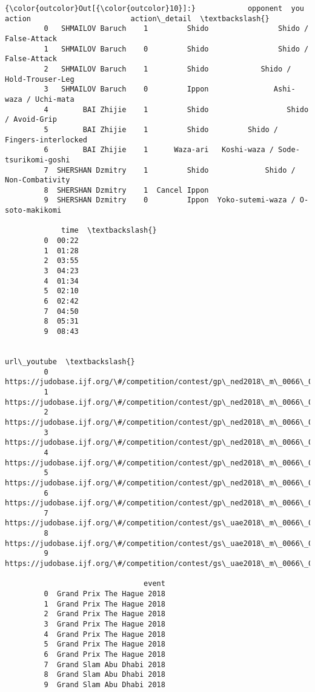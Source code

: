 \documentclass[11pt]{article}
\begin{document}
\begin{Verbatim}[commandchars=\\\{\}]
{\color{outcolor}Out[{\color{outcolor}10}]:}            opponent  you        action                       action\_detail  \textbackslash{}
         0   SHMAILOV Baruch    1         Shido                Shido / False-Attack   
         1   SHMAILOV Baruch    0         Shido                Shido / False-Attack   
         2   SHMAILOV Baruch    1         Shido            Shido / Hold-Trouser-Leg   
         3   SHMAILOV Baruch    0         Ippon               Ashi-waza / Uchi-mata   
         4        BAI Zhijie    1         Shido                  Shido / Avoid-Grip   
         5        BAI Zhijie    1         Shido         Shido / Fingers-interlocked   
         6        BAI Zhijie    1      Waza-ari   Koshi-waza / Sode-tsurikomi-goshi   
         7  SHERSHAN Dzmitry    1         Shido             Shido / Non-Combativity   
         8  SHERSHAN Dzmitry    1  Cancel Ippon                                       
         9  SHERSHAN Dzmitry    0         Ippon  Yoko-sutemi-waza / O-soto-makikomi   
         
             time  \textbackslash{}
         0  00:22   
         1  01:28   
         2  03:55   
         3  04:23   
         4  01:34   
         5  02:10   
         6  02:42   
         7  04:50   
         8  05:31   
         9  08:43   
         
                                                                      url\_youtube  \textbackslash{}
         0  https://judobase.ijf.org/\#/competition/contest/gp\_ned2018\_m\_0066\_0055   
         1  https://judobase.ijf.org/\#/competition/contest/gp\_ned2018\_m\_0066\_0055   
         2  https://judobase.ijf.org/\#/competition/contest/gp\_ned2018\_m\_0066\_0055   
         3  https://judobase.ijf.org/\#/competition/contest/gp\_ned2018\_m\_0066\_0055   
         4  https://judobase.ijf.org/\#/competition/contest/gp\_ned2018\_m\_0066\_0046   
         5  https://judobase.ijf.org/\#/competition/contest/gp\_ned2018\_m\_0066\_0046   
         6  https://judobase.ijf.org/\#/competition/contest/gp\_ned2018\_m\_0066\_0046   
         7  https://judobase.ijf.org/\#/competition/contest/gs\_uae2018\_m\_0066\_0033   
         8  https://judobase.ijf.org/\#/competition/contest/gs\_uae2018\_m\_0066\_0033   
         9  https://judobase.ijf.org/\#/competition/contest/gs\_uae2018\_m\_0066\_0033   
         
                                event  
         0  Grand Prix The Hague 2018  
         1  Grand Prix The Hague 2018  
         2  Grand Prix The Hague 2018  
         3  Grand Prix The Hague 2018  
         4  Grand Prix The Hague 2018  
         5  Grand Prix The Hague 2018  
         6  Grand Prix The Hague 2018  
         7  Grand Slam Abu Dhabi 2018  
         8  Grand Slam Abu Dhabi 2018  
         9  Grand Slam Abu Dhabi 2018  
\end{Verbatim}
            
\end{document}
